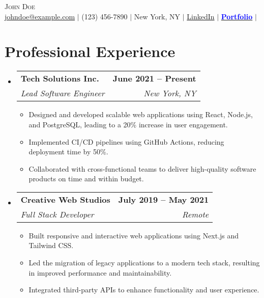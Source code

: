 \documentclass[letterpaper,11pt]{article}
\makeatletter
\newcommand{\resumeItem}[1]{%
  \item\small{%
    {#1}%
  }%
}
\newcommand{\resumeSubheading}[4]{%
  \vspace{2pt}\item%
    \begin{tabular*}{\textwidth}[t]{@{\hskip 0pt}l@{\extracolsep{\fill}}r@{}}%
      \textbf{\normalsize #1} & \textbf{\normalsize #2} \\
      \textit{\small#3} & \textit{\small#4} \\
    \end{tabular*}%
}
\newenvironment{resumeSubHeadingList}{%
  \begin{itemize}[leftmargin=0.15in, label={}]%
}{%
  \end{itemize}%
}
\newenvironment{resumeItemList}{%
  \begin{itemize}[leftmargin=*, label=\textbullet]%
}{%
  \end{itemize}%
}
\makeatother
\begin{document}
\begin{center}
    {\Huge \scshape John Doe} \\ \vspace{2pt}
    \small
    \href{mailto:johndoe@example.com}{johndoe@example.com} $|$
    (123) 456-7890 $|$
    New York, NY $|$
    \href{https://www.linkedin.com/in/johndoe}{LinkedIn} $|$
    \href{https://johndoe-portfolio.com}{\textbf{\textcolor{blue}{Portfolio}}} $|$
    \href{https://github.com/johndoe}{\raisebox{-0.1\height}{\faGithub}}
\end{center}

\section{Professional Experience}
  \begin{resumeSubHeadingList}

    \resumeSubheading
      {Tech Solutions Inc.}{June 2021 -- Present}
      {Lead Software Engineer}{New York, NY}
      \begin{resumeItemList}
        \resumeItem{Designed and developed scalable web applications using React, Node.js, and PostgreSQL, leading to a 20\% increase in user engagement.}
        \resumeItem{Implemented CI/CD pipelines using GitHub Actions, reducing deployment time by 50\%.}
        \resumeItem{Collaborated with cross-functional teams to deliver high-quality software products on time and within budget.}
      \end{resumeItemList}

    \resumeSubheading
      {Creative Web Studios}{July 2019 -- May 2021}
      {Full Stack Developer}{Remote}
      \begin{resumeItemList}
        \resumeItem{Built responsive and interactive web applications using Next.js and Tailwind CSS.}
        \resumeItem{Led the migration of legacy applications to a modern tech stack, resulting in improved performance and maintainability.}
        \resumeItem{Integrated third-party APIs to enhance functionality and user experience.}
      \end{resumeItemList}

  \end{resumeSubHeadingList}

\end{document}
